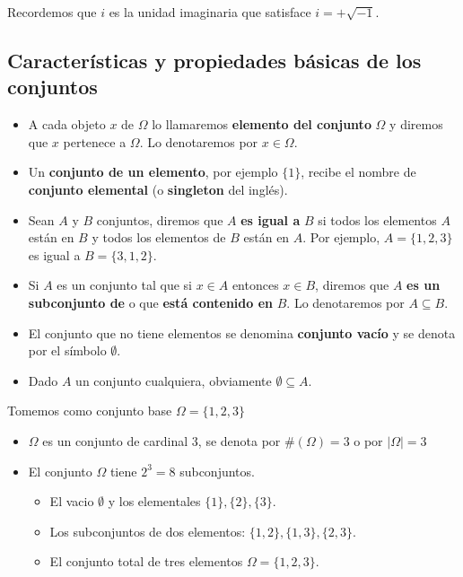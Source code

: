 \documentclass[
  letterpaper,
  DIV=11,
  numbers=noendperiod]{scrreprt}
\providecommand{\tightlist}{%
  \setlength{\itemsep}{0pt}\setlength{\parskip}{0pt}}\usepackage{longtable,booktabs,array}
\begin{document}
Recordemos que \(i\) es la unidad imaginaria que satisface
\(i = +\sqrt{-1}\).

\hypertarget{caracteruxedsticas-y-propiedades-buxe1sicas-de-los-conjuntos}{%
\subsection{Características y propiedades básicas de los
conjuntos}\label{caracteruxedsticas-y-propiedades-buxe1sicas-de-los-conjuntos}}

\begin{itemize}
\tightlist
\item
  A cada objeto \(x\) de \(\Omega\) lo llamaremos \textbf{elemento del
  conjunto} \(\Omega\) y diremos que \(x\) pertenece a \(\Omega\). Lo
  denotaremos por \(x\in \Omega\).
\item
  Un \textbf{conjunto de un elemento}, por ejemplo \(\{1\}\), recibe el
  nombre de \textbf{conjunto elemental} (o \textbf{singleton} del
  inglés).
\item
  Sean \(A\) y \(B\) conjuntos, diremos que \(A\) \textbf{es igual a}
  \(B\) si todos los elementos \(A\) están en \(B\) y todos los
  elementos de \(B\) están en \(A\). Por ejemplo, \(A=\{1,2,3\}\) es
  igual a \(B=\{3,1,2\}\).
\item
  Si \(A\) es un conjunto tal que si \(x\in A\) entonces \(x\in B\),
  diremos que \(A\) \textbf{es un subconjunto de} o que \textbf{está
  contenido en} \(B\). Lo denotaremos por \(A\subseteq B.\)
\item
  El conjunto que no tiene elementos se denomina \textbf{conjunto vacío}
  y se denota por el símbolo \(\emptyset\).
\item
  Dado \(A\) un conjunto cualquiera, obviamente
  \(\emptyset\subseteq A.\)
\end{itemize}

Tomemos como conjunto base \(\Omega=\{1,2,3\}\)

\begin{itemize}
\tightlist
\item
  \(\Omega\) es un conjunto de cardinal 3, se denota por
  \(\#(\Omega)=3\) o por \(|\Omega|=3\)
\item
  El conjunto \(\Omega\) tiene \(2^3=8\) subconjuntos.

  \begin{itemize}
  \tightlist
  \item
    El vacio \(\emptyset\) y los elementales \(\{1\},\{2\},\{3\}\).
  \item
    Los subconjuntos de dos elementos: \(\{1,2\},\{1,3\},\{2,3\}\).
  \item
    El conjunto total de tres elementos \(\Omega=\{1,2,3\}.\)
  \end{itemize}
\end{itemize}
\end{document}

